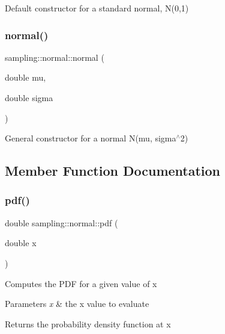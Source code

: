 Default constructor for a standard normal, N(0,1) \mbox{\label{classsampling_1_1normal_a94983a66f0b0b3ef8414e8811660c797}} 
\subsubsection{\texorpdfstring{normal()}{normal()}\hspace{0.1cm}{\footnotesize\ttfamily [2/2]}}
{\footnotesize\ttfamily sampling\+::normal\+::normal (\begin{DoxyParamCaption}\item[{double}]{mu,  }\item[{double}]{sigma }\end{DoxyParamCaption})}

General constructor for a normal N(mu, sigma$^\wedge$2) 

\subsection{Member Function Documentation}
\mbox{\label{classsampling_1_1normal_ad9da5ab3d50569e418f00ace7ac26fa7}} 
\subsubsection{\texorpdfstring{pdf()}{pdf()}}
{\footnotesize\ttfamily double sampling\+::normal\+::pdf (\begin{DoxyParamCaption}\item[{double}]{x }\end{DoxyParamCaption})}

Computes the P\+DF for a given value of x 
\begin{DoxyParams}{Parameters}
{\em x} & the x value to evaluate \\
\hline
\end{DoxyParams}
\begin{DoxyReturn}{Returns}
the probability density function at x 
\end{DoxyReturn}
\mbox{\label{classsampling_1_1normal_a9a74b03f4276eb622d3c259fd8a1ea01}} 
